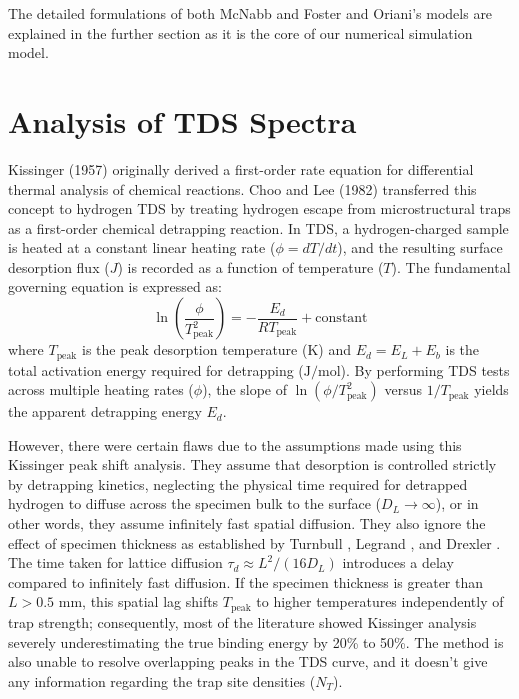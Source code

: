 \documentclass[a4paper,12pt,oneside]{report}
\begin{document}
The detailed formulations of both McNabb and Foster and Oriani's models are explained in the further section as it is the core of our numerical simulation model.

\section{Analysis of TDS Spectra}
\label{sec:analysis_of_tds}

Kissinger (1957) originally derived a first-order rate equation for differential thermal analysis of chemical reactions. Choo and Lee (1982) transferred this concept to hydrogen TDS by treating hydrogen escape from microstructural traps as a first-order chemical detrapping reaction. In TDS, a hydrogen-charged sample is heated at a constant linear heating rate ($\phi = dT/dt$), and the resulting surface desorption flux ($J$) is recorded as a function of temperature ($T$). The fundamental governing equation is expressed as:
\begin{equation}
    \ln\left(\frac{\phi}{T_{\text{peak}}^2}\right) = -\frac{E_d}{R T_{\text{peak}}} + \text{constant}
\end{equation}
where $T_{\text{peak}}$ is the peak desorption temperature ($\text{K}$) and $E_d = E_L + E_b$ is the total activation energy required for detrapping ($\text{J/mol}$). By performing TDS tests across multiple heating rates ($\phi$), the slope of $\ln(\phi/T_{\text{peak}}^2)$ versus $1/T_{\text{peak}}$ yields the apparent detrapping energy $E_d$.

However, there were certain flaws due to the assumptions made using this Kissinger peak shift analysis. They assume that desorption is controlled strictly by detrapping kinetics, neglecting the physical time required for detrapped hydrogen to diffuse across the specimen bulk to the surface ($D_L \to \infty$), or in other words, they assume infinitely fast spatial diffusion. They also ignore the effect of specimen thickness as established by Turnbull \cite{Turnbull1997}, Legrand \cite{Legrand2015}, and Drexler \cite{Drexler2019}. The time taken for lattice diffusion $\tau_d \approx L^2 / (16 D_L)$ introduces a delay compared to infinitely fast diffusion. If the specimen thickness is greater than $L > 0.5\text{ mm}$, this spatial lag shifts $T_{\text{peak}}$ to higher temperatures independently of trap strength; consequently, most of the literature showed Kissinger analysis severely underestimating the true binding energy by 20\% to 50\%. The method is also unable to resolve overlapping peaks in the TDS curve, and it doesn't give any information regarding the trap site densities ($N_T$).
\end{document}
